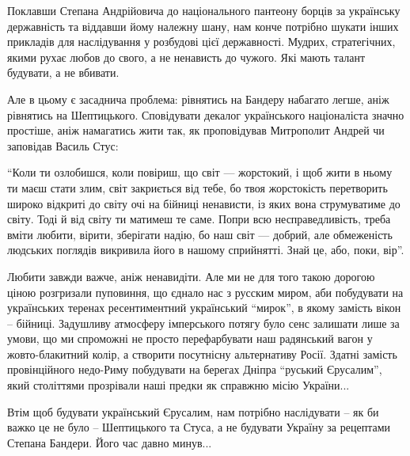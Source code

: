 Поклавши Степана Андрійовича до національного пантеону борців за українську
державність та віддавши йому належну шану, нам конче потрібно шукати інших
прикладів для наслідування у розбудові цієї державності. Мудрих, стратегічних,
якими рухає любов до свого, а не ненависть до чужого. Які мають талант
будувати, а не вбивати.

Але в цьому є засаднича проблема: рівнятись на Бандеру набагато легше, аніж
рівнятись на Шептицького. Сповідувати декалог українського націоналіста значно
простіше, аніж намагатись жити так, як проповідував Митрополит Андрей чи
заповідав Василь Стус:

\begin{zznagolos}
\enquote{Коли ти озлобишся, коли повіриш, що світ — жорстокий, і щоб жити в ньому ти
маєш стати злим, світ закриється від тебе, бо твоя жорстокість перетворить
широко відкриті до світу очі на бійниці ненависти, із яких вона струмуватиме до
світу. Тоді й від світу ти матимеш те саме. Попри всю несправедливість, треба
вміти любити, вірити, зберігати надію, бо наш світ — добрий, але обмеженість
людських поглядів викривила його в нашому сприйнятті. Знай це, або, поки, вір}.
\end{zznagolos}

Любити завжди важче, аніж ненавидіти. Але ми не для того такою дорогою ціною
розгризали пуповиння, що єднало нас з русским миром, аби побудувати на
українських теренах ресентиментний український \enquote{мирок}, в якому замість вікон –
бійниці. Задушливу атмосферу імперського потягу було сенс залишати лише за
умови, що ми спроможні не просто перефарбувати наш радянський вагон у
жовто-блакитний колір, а створити посутнісну альтернативу Росії. Здатні замість
провінційного недо-Риму побудувати на берегах Дніпра \enquote{руський Єрусалим}, який
століттями прозрівали наші предки як справжню місію України...

Втім щоб будувати український Єрусалим, нам потрібно наслідувати – як би важко
це не було – Шептицького та Стуса, а не будувати Україну за рецептами Степана
Бандери. Його час давно минув...


